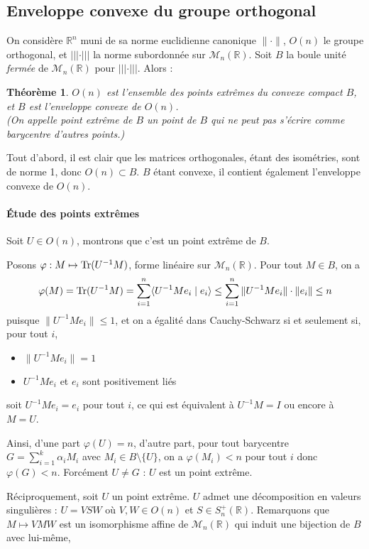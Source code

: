 \documentclass[a4paper, 11pt]{article}
\def\R{\mathbb{R}}
\def\M{\mathcal{M}}
\def\Tr{\textnormal{Tr}}
\newtheorem*{theorem}{Théorème}
\begin{document}
\subsection{Enveloppe convexe du groupe orthogonal}

On considère $\R^n$ muni de sa norme euclidienne canonique $\|\cdot\|$, $O(n)$
le groupe orthogonal, et $||| \cdot |||$ la norme subordonnée sur $\M_n(\R)$.
Soit $B$ la boule unité \emph{fermée} de $\M_n(\R)$ pour $||| \cdot |||$.
Alors :

\begin{theorem}
  $O(n)$ est l'ensemble des points extrêmes du convexe compact $B$, et $B$ est
  l'enveloppe convexe de $O(n)$.\\
  (On appelle \emph{point extrême} de $B$ un point de $B$ qui ne peut pas s'écrire
  comme barycentre d'autres points.)
\end{theorem}

Tout d'abord, il est clair que les matrices orthogonales, étant des isométries,
sont de norme 1, donc $O(n) \subset B$. $B$ étant convexe, il contient également
l'enveloppe convexe de $O(n)$.

\paragraph{Étude des points extrêmes} Soit $U \in O(n)$, montrons que c'est un
point extrême de $B$.

Posons $\varphi : M \mapsto \Tr(U^{-1}M)$, forme linéaire sur $\M_n(\R)$. Pour tout
$M \in B$, on a
\[ \varphi(M) = \Tr(U^{-1}M) = \sum_{i=1}^n \langle U^{-1}M e_i \mid e_i \rangle
\leq \sum_{i=1}^n \| U^{-1}M e_i \| \cdot \| e_i \| \leq n \]
puisque $\| U^{-1}M e_i \| \leq 1$, et on a égalité dans Cauchy-Schwarz si et
seulement si, pour tout $i$,
\begin{itemize}
\item $\| U^{-1}M e_i \| = 1$
\item $U^{-1}M e_i$ et $e_i$ sont positivement liés
\end{itemize}
soit $U^{-1}M e_i = e_i$ pour tout $i$, ce qui est équivalent à $U^{-1}M = I$ ou
encore à $M = U$.

Ainsi, d'une part $\varphi(U) = n$, d'autre part, pour tout barycentre $G =
\sum_{i=1}^k \alpha_i M_i$ avec $M_i \in B \setminus \{U\}$, on a $\varphi(M_i) <
n$ pour tout $i$ donc $\varphi(G) < n$. Forcément $U \neq G$ : $U$ est un point
extrême.

Réciproquement, soit $U$ un point extrême. $U$ admet une décomposition en
valeurs singulières : $U = VSW$ où $V, W \in O(n)$ et $S \in S_n^+(\R)$.
Remarquons que $M \mapsto VMW$ est un isomorphisme affine de $\M_n(\R)$ qui
induit une bijection de $B$ avec lui-même,
\end{document}
